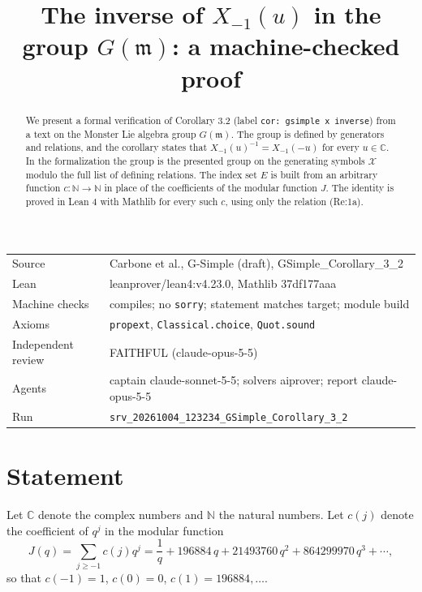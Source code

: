 \documentclass[11pt]{article}
\title{The inverse of $X_{-1}(u)$ in the group $G(\mathfrak{m})$: a machine-checked proof}
\date{}
\theoremstyle{definition}
\theoremstyle{remark}
\begin{document}
\maketitle
\begin{abstract}
We present a formal verification of Corollary 3.2 (label \texttt{cor: gsimple x inverse}) from a text on the Monster Lie algebra group $G(\mathfrak{m})$. The group is defined by generators and relations, and the corollary states that $X_{-1}(u)^{-1}=X_{-1}(-u)$ for every $u\in\mathbb{C}$. In the formalization the group is the presented group on the generating symbols $\mathcal{X}$ modulo the full list of defining relations. The index set $E$ is built from an arbitrary function $c:\mathbb{N}\to\mathbb{N}$ in place of the coefficients of the modular function $J$. The identity is proved in Lean 4 with Mathlib for every such $c$, using only the relation (Re:1a).
\end{abstract}

\begin{center}\small
\begin{tabular}{@{}ll@{}}
\toprule
Source & Carbone et al., G-Simple (draft), GSimple\_Corollary\_3\_2 \\
Lean & leanprover/lean4:v4.23.0, Mathlib 37df177aaa \\
Machine checks & compiles; no \texttt{sorry}; statement matches target; module build \\
Axioms & \texttt{propext}, \texttt{Classical.choice}, \texttt{Quot.sound} \\
Independent review & FAITHFUL (claude-opus-5-5) \\
Agents & captain claude-sonnet-5-5; solvers aiprover; report claude-opus-5-5 \\
Run & \texttt{srv\_20261004\_123234\_GSimple\_Corollary\_3\_2} \\
\bottomrule
\end{tabular}
\end{center}

\tableofcontents

\section{Statement}

Let $\mathbb{C}$ denote the complex numbers and $\mathbb{N}$ the natural numbers. Let $c(j)$ denote the coefficient of $q^j$ in the modular function
\[
J(q)=\sum_{j\geq -1}c(j)q^j=\frac{1}{q}+196884\,q+21493760\,q^2+864299970\,q^3+\cdots,
\]
so that $c(-1)=1$, $c(0)=0$, $c(1)=196884,\dots$.
\end{document}
